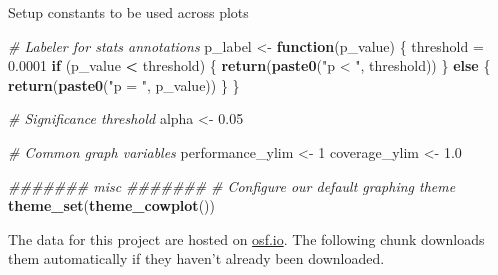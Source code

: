 \documentclass[]{book}
\newenvironment{Shaded}{\begin{snugshade}}{\end{snugshade}}
\newcommand{\CommentTok}[1]{\textcolor[rgb]{0.56,0.35,0.01}{\textit{#1}}}
\newcommand{\ControlFlowTok}[1]{\textcolor[rgb]{0.13,0.29,0.53}{\textbf{#1}}}
\newcommand{\DecValTok}[1]{\textcolor[rgb]{0.00,0.00,0.81}{#1}}
\newcommand{\FloatTok}[1]{\textcolor[rgb]{0.00,0.00,0.81}{#1}}
\newcommand{\KeywordTok}[1]{\textcolor[rgb]{0.13,0.29,0.53}{\textbf{#1}}}
\newcommand{\NormalTok}[1]{#1}
\newcommand{\OperatorTok}[1]{\textcolor[rgb]{0.81,0.36,0.00}{\textbf{#1}}}
\newcommand{\StringTok}[1]{\textcolor[rgb]{0.31,0.60,0.02}{#1}}
\begin{document}
Setup constants to be used across plots

\begin{Shaded}
\begin{Highlighting}[]
\CommentTok{# Labeler for stats annotations}
\NormalTok{p_label <-}\StringTok{ }\ControlFlowTok{function}\NormalTok{(p_value) \{}
\NormalTok{  threshold =}\StringTok{ }\FloatTok{0.0001}
  \ControlFlowTok{if}\NormalTok{ (p_value }\OperatorTok{<}\StringTok{ }\NormalTok{threshold) \{}
    \KeywordTok{return}\NormalTok{(}\KeywordTok{paste0}\NormalTok{(}\StringTok{"p < "}\NormalTok{, threshold))}
\NormalTok{  \} }\ControlFlowTok{else}\NormalTok{ \{}
    \KeywordTok{return}\NormalTok{(}\KeywordTok{paste0}\NormalTok{(}\StringTok{"p = "}\NormalTok{, p_value))}
\NormalTok{  \}}
\NormalTok{\}}

\CommentTok{# Significance threshold}
\NormalTok{alpha <-}\StringTok{ }\FloatTok{0.05}

\CommentTok{# Common graph variables}
\NormalTok{performance_ylim <-}\StringTok{ }\DecValTok{1}
\NormalTok{coverage_ylim <-}\StringTok{ }\FloatTok{1.0}

\CommentTok{####### misc #######}
\CommentTok{# Configure our default graphing theme}
\KeywordTok{theme_set}\NormalTok{(}\KeywordTok{theme_cowplot}\NormalTok{())}
\end{Highlighting}
\end{Shaded}

The data for this project are hosted on \href{https://osf.io/6rndg/}{osf.io}. The following chunk downloads them automatically if they haven't already been downloaded.
\end{document}
